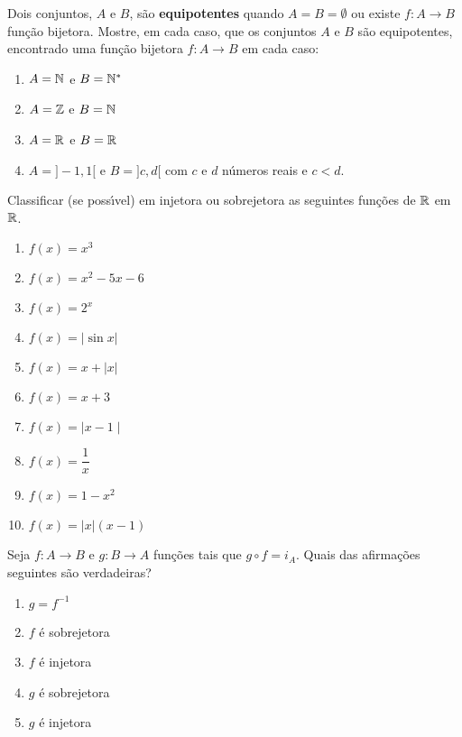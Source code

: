 \documentclass[12pt]{exam}
\begin{document}
\vspace{.3cm}

\questao Dois conjuntos, $A$ e $B$, s\~ao \textbf{equipotentes} quando $A = B = \emptyset$ ou existe $f : A \to B$ fun\c{c}\~ao	bijetora. Mostre, em cada caso, que os conjuntos $A$ e $B$ s\~ao equipotentes, encontrado uma fun\c{c}\~ao bijetora $f : A \to B$ em cada caso:
\begin{enumerate}[label={\alph*})]
	\item $A = \mathbb{N}$ e $B = \mathbb{N}^*$
	\item $A = \mathbb{Z}$ e $B = \mathbb{N}$
	\item $A = \mathbb{R}$ e $B = \mathbb{R}$
	\item $A = ]-1, 1[$ e $B = ]c,d[$ com $c$ e $d$ n\'umeros reais e $c < d$.
\end{enumerate}

\newpage

\questao Classificar (se poss{\'\i}vel) em injetora ou sobrejetora as seguintes fun{\c c}{\~o}es de $\mathbb{R}$ em $\mathbb{R}$.

\begin{multicols}{2}
	\begin{enumerate}[label={\alph*})]
		\item $f(x) = x^3$
		\item $f(x) = x^2 - 5x - 6$
		\item $f(x) = 2^x$
		\item $f(x) = | \sin x |$
		\item $f(x) = x + | x |$
		\item $f(x) = x + 3$
		\item $f(x) = \mid x - 1\mid$
		\item $f(x) = \dfrac{1}{x}$
		\item $f(x) = 1 - x^2$
		\item $f(x) = |x|(x - 1)$
	\end{enumerate}
\end{multicols}

\vspace{.3cm}

\questao Seja $f : A \to B$ e $g : B \to A$ fun\c{c}\~oes tais que $g \circ f = i_A$. Quais das afirma\c{c}\~oes seguintes s\~ao verdadeiras?
\begin{enumerate}[label={\alph*})]
	\item $g = f^{-1}$
	\item $f$ \'e sobrejetora
	\item $f$ \'e injetora
	\item $g$ \'e sobrejetora
	\item $g$ \'e injetora
\end{enumerate}
\end{document}
